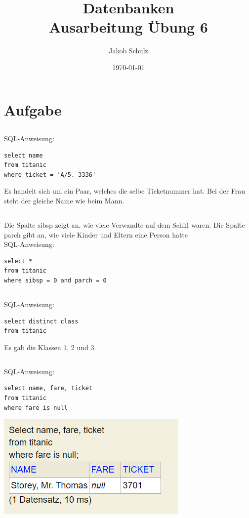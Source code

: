 \documentclass[a4paper, 11pt, titlepage]{article}
\begin{document}
\title{Datenbanken \\
Ausarbeitung \"Ubung 6}

\author{Jakob Schulz}

\date{\today}

\maketitle{\thispagestyle{plain}}

\section{Aufgabe}
\subsection{}
SQL-Anweisung:
\begin{lstlisting}
select name
from titanic
where ticket = 'A/5. 3336'
\end{lstlisting}
Es handelt sich um ein Paar, welches die selbe Ticketnummer hat. Bei der Frau steht der gleiche Name wie beim Mann.
\subsection{}
Die Spalte sibsp zeigt an, wie viele Verwandte auf dem Schiff waren. Die Spalte parch gibt an, wie viele Kinder und Eltern eine Person hatte\\
SQL-Anweisung:
\begin{lstlisting}
select *
from titanic
where sibsp = 0 and parch = 0
\end{lstlisting}
\subsection{}
SQL-Anweisung:
\begin{lstlisting}
select distinct class
from titanic
\end{lstlisting}
Es gab die Klassen 1, 2 und 3.
\subsection{}
SQL-Anweisung:
\begin{lstlisting}
select name, fare, ticket
from titanic
where fare is null
\end{lstlisting}
\includegraphics [width = 4 cm] {d}
\newpage
\end{document}

